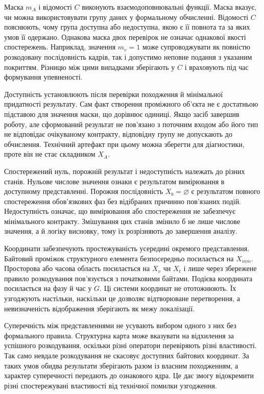 Маска $m_A$ і відомості $C$ виконують взаємодоповнювальні функції. Маска вказує, чи можна використовувати групу даних у формальному обчисленні. Відомості $C$ пояснюють, чому група доступна або недоступна, якою є її повнота та за яких умов її одержано. Однакова маска двох перевірок не означає однакової якості спостережень. Наприклад, значення $m_v=1$ може супроводжувати як повністю розкодовану послідовність кадрів, так і допустимо неповне подання з указаним покриттям. Різницю між цими випадками зберігають у $C$ і враховують під час формування упевненості.

Доступність установлюють після перевірки походження й мінімальної придатності результату. Сам факт створення проміжного об’єкта не є достатньою підставою для значення маски, що дорівнює одиниці. Якщо засіб завершив роботу, але сформований результат не пов’язано з поточним входом або його тип не відповідає очікуваному контракту, відповідну групу не допускають до обчислення. Технічний артефакт при цьому можна зберегти для діагностики, проте він не стає складником $X_A$.

Спостережений нуль, порожній результат і недоступність належать до різних станів. Нульове числове значення ознаки є результатом вимірювання в доступному представленні. Порожня послідовність $X_b=\varnothing$ є результатом повного спостереження обов’язкових фаз без відібраних причинно пов’язаних подій. Недоступність означає, що вимірювання або спостереження не забезпечує мінімального контракту. Змішування цих станів змінило б не лише числове значення, а й логіку висновку, тому їх розрізняють до завершення аналізу.

Координати забезпечують простежуваність усередині окремого представлення. Байтовий проміжок структурного елемента безпосередньо посилається на $X_{mm}$. Просторова або часова область посилається на $X_v$ чи $X_t$ і лише через збережене правило розкодування пов’язується з початковими байтами. Подієва координата посилається на фазу й час у $G$. Ці системи координат не ототожнюють. Їх узгоджують настільки, наскільки це дозволяє відтворюване перетворення, а невизначеність відображення зберігають як межу локалізації.

Суперечність між представленнями не усувають вибором одного з них без формального правила. Структурна карта може вказувати на відхилення за успішного розкодування, оскільки різні оператори перевіряють різні властивості. Так само невдале розкодування не скасовує доступних байтових координат. За таких умов обидва результати зберігають разом із власним походженням, а характер суперечності передають до ознакового ядра. Це дає змогу відокремити різні спостережувані властивості від технічної помилки узгодження.

